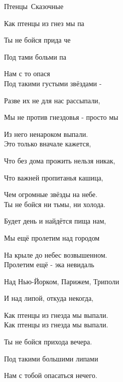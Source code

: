 \documentclass[11pt,a5paper]{book}
\begin{document}
\begin{song}{Птенцы}{}{~}{Сказочные}{}{}

  

Как птенцы из гнез мы па\par
Ты не бойся прида че\par
Под тами больми па\par
Нам с то опася \\
 
Под такими густыми звёздами -\par
Разве их не для нас рассыпали,\par
Мы не против гнездовья - просто мы\par
Из него ненароком выпали.\\

Это только вначале кажется,\par
Что без дома прожить нельзя никак,\par
Что важней пропитанья кашица,\par
Чем огромные звёзды на небе.\\

Ты не бойся ни тьмы, ни холода.\par
Будет день и найдётся пища нам,\par
Мы ещё пролетим над городом\par
На крыле до небес возвышенном.\\

Пролетим ещё - эка невидаль\par
Над Нью-Йорком, Парижем, Триполи\par
И над липой, откуда некогда,\par
Как птенцы из гнезда мы выпали.\\

Как птенцы из гнезда мы выпали.\par
Ты не бойся прихода вечера.\par
Под такими большими липами\par
Нам с тобой опасаться нечего.\\

\end{song}
\end{document}
